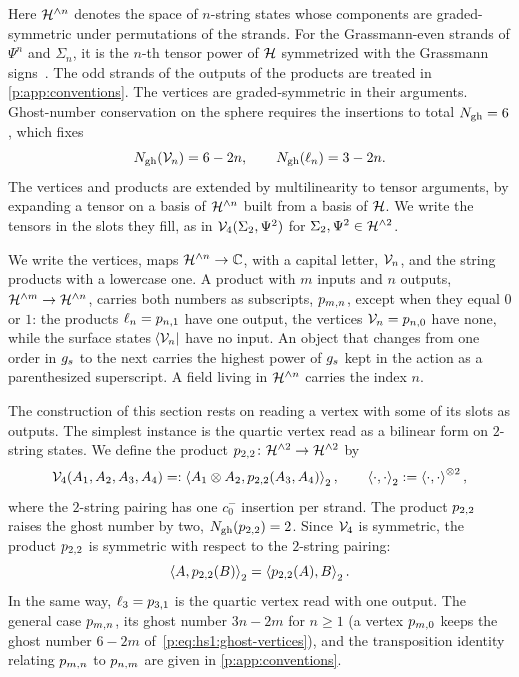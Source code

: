 Here $\Hn{n}$ denotes the space of $n$-string states whose components are graded-symmetric under permutations of the strands.
For the Grassmann-even strands of $\Psi^n$ and $\Sigma_n$, it is the $n$-th tensor power of $\Hs$ symmetrized with the Grassmann signs~\cite{Erler:2014:NSNSSectorClosed, Erbin:2020:ClassicalAlgebraicStructures}.
The odd strands of the outputs of the products are treated in \cref{p:app:conventions}.
The vertices are graded-symmetric in their arguments.
Ghost-number conservation on the sphere requires the insertions to total $\Ngh = 6$, which fixes
\begin{equation}
  \label{p:eq:hs1:ghost-vertices}
  \Ngh(\vertex{n})
    = 6 - 2n,
  \qquad
  \Ngh(\ell_n)
    = 3 - 2n.
\end{equation}
The vertices and products are extended by multilinearity to tensor arguments, by expanding a tensor on a basis of $\Hn{n}$ built from a basis of $\Hs$.
We write the tensors in the slots they fill, as in $\vertex{4}(\Sigma_2, \Psi^2)$ for $\Sigma_2, \Psi^2 \in \Hn{2}$.

We write the vertices, maps $\Hn{n} \to \C$, with a capital letter, $\vertex{n}$, and the string products with a lowercase one.
A product with $m$ inputs and $n$ outputs, $\Hn{m} \to \Hn{n}$, carries both numbers as subscripts, $\sprod{m}{n}$, except when they equal $0$ or $1$: the products $\ell_n = \sprod{n}{1}$ have one output, the vertices $\vertex{n} = \sprod{n}{0}$ have none, while the surface states $\bra{\mc V_n}$ have no input.
An object that changes from one order in $\gs$ to the next carries the highest power of $\gs$ kept in the action as a parenthesized superscript.
A field living in $\Hn{n}$ carries the index $n$.

The construction of this section rests on reading a vertex with some of its slots as outputs.
The simplest instance is the quartic vertex read as a bilinear form on $2$-string states.
We define the product $\sprod{2}{2} \colon \Hn{2} \to \Hn{2}$ by
\begin{equation}
  \label{p:eq:hs1:p22}
  \vertex{4}(A_1, A_2, A_3, A_4)
    =: \pair[2]{A_1 \otimes A_2}{\sprod{2}{2}(A_3, A_4)},
  \qquad
  \pair[2]{\cdot}{\cdot}
    := \pair{\cdot}{\cdot}^{\otimes 2},
\end{equation}
where the $2$-string pairing has one $c_0^-$ insertion per strand.
The product $\sprod{2}{2}$ raises the ghost number by two, $\Ngh(\sprod{2}{2}) = 2$.
Since $\vertex{4}$ is symmetric, the product $\sprod{2}{2}$ is symmetric with respect to the $2$-string pairing:
\begin{equation}
  \label{p:eq:hs1:p22-symmetric}
  \pair[2]{A}{\sprod{2}{2}(B)}
    = \pair[2]{\sprod{2}{2}(A)}{B}.
\end{equation}
In the same way, $\ell_3 = \sprod{3}{1}$ is the quartic vertex read with one output.
The general case $\sprod{m}{n}$, its ghost number $3n - 2m$ for $n \ge 1$ (a vertex $\sprod{m}{0}$ keeps the ghost number $6 - 2m$ of~\eqref{p:eq:hs1:ghost-vertices}), and the transposition identity relating $\sprod{m}{n}$ to $\sprod{n}{m}$ are given in \cref{p:app:conventions}.

